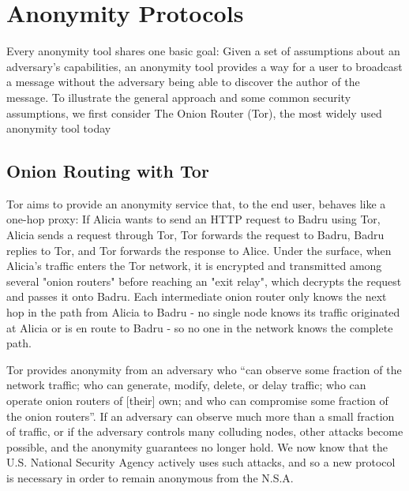 \section{Anonymity Protocols}
\label{subsection:ExistingAnonymity}
  Every anonymity tool shares one basic goal: Given a set of assumptions about
  an adversary's capabilities, an anonymity tool provides a way for a user to
  broadcast a message without the adversary being able to discover the author
  of the message.  To illustrate the general approach and some common
  security assumptions, we first consider The Onion Router (Tor), the most
  widely used anonymity tool today\cite{ford_hiding_2014}

  \subsection{Onion Routing with Tor}
    Tor aims to provide an anonymity service that, to the end user, behaves like
    a one-hop proxy: If Alicia wants to send an HTTP request to Badru using Tor,
    Alicia sends a request through Tor, Tor forwards the request to Badru, Badru
    replies to Tor, and Tor forwards the response to Alice. Under the surface,
    when Alicia's traffic enters the Tor network, it is encrypted and
    transmitted among several "onion routers" before reaching an "exit relay",
    which decrypts the request and passes it onto Badru. Each intermediate onion
    router only knows the next hop in the path from Alicia to Badru - no single
    node knows its traffic originated at Alicia or is en route to Badru - so no
    one in the network knows the complete path.

    Tor provides anonymity from an adversary who ``can observe some fraction of
    the network traffic; who can generate, modify, delete, or delay traffic; who
    can operate onion routers of [their] own; and who can compromise some
    fraction of the onion routers''\cite{dingledine_tor:_2004}. If an adversary
    can observe much more than a small fraction of traffic, or if the adversary
    controls many colluding nodes, other attacks become possible, and the
    anonymity guarantees no longer hold. We now know that the U.S. National
    Security Agency actively uses such attacks, and so a new protocol is
    necessary in order to remain anonymous from the N.S.A.

